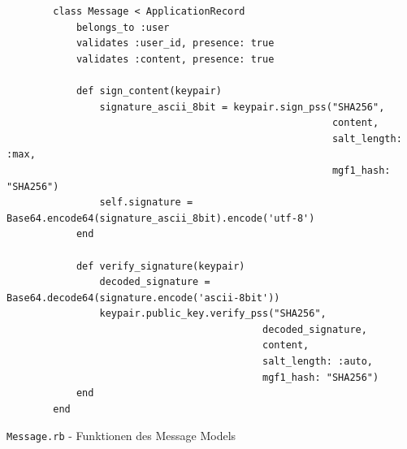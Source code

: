 \documentclass[11pt,a4paper,ngerman]{scrreprt}
\begin{document}
\begin{listing}[htpb]
    \begin{verbatim}
        class Message < ApplicationRecord
            belongs_to :user
            validates :user_id, presence: true
            validates :content, presence: true

            def sign_content(keypair)
                signature_ascii_8bit = keypair.sign_pss("SHA256",
                                                        content,
                                                        salt_length: :max,
                                                        mgf1_hash: "SHA256")
                self.signature = Base64.encode64(signature_ascii_8bit).encode('utf-8')
            end

            def verify_signature(keypair)
                decoded_signature = Base64.decode64(signature.encode('ascii-8bit'))
                keypair.public_key.verify_pss("SHA256",
                                            decoded_signature,
                                            content,
                                            salt_length: :auto,
                                            mgf1_hash: "SHA256")
            end
        end
    \end{verbatim}
    \caption{\texttt{Message.rb} - Funktionen des Message Models}
    \label{lst:Message.rb}
\end{listing}
\clearpage
\end{document}
